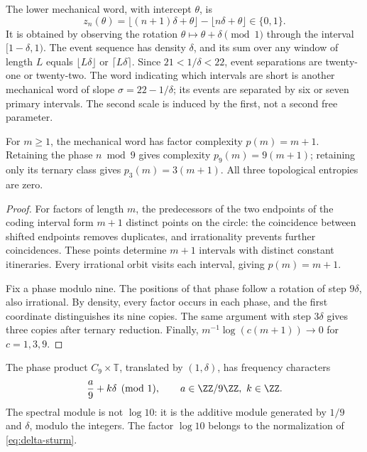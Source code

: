 The lower mechanical word, with intercept \(\theta\), is
\[
 z_n(\theta)=\lfloor(n+1)\delta+\theta\rfloor-\lfloor n\delta+\theta\rfloor\in\{0,1\}.
\]
It is obtained by observing the rotation \(\theta\mapsto\theta+\delta\pmod1\) through the interval \([1-\delta,1)\). The event sequence has density \(\delta\), and its sum over any window of length \(L\) equals \(\lfloor L\delta\rfloor\) or \(\lceil L\delta\rceil\). Since \(21<1/\delta<22\), event separations are twenty-one or twenty-two. The word indicating which intervals are short is another mechanical word of slope \(\sigma=22-1/\delta\); its events are separated by six or seven primary intervals. The second scale is induced by the first, not a second free parameter.



\begin{theorem}
For \(m\ge1\), the mechanical word has factor complexity \(p(m)=m+1\). Retaining the phase \(n\bmod9\) gives complexity \(p_9(m)=9(m+1)\); retaining only its ternary class gives \(p_3(m)=3(m+1)\). All three topological entropies are zero.
\end{theorem}
\begin{proof}
For factors of length \(m\), the predecessors of the two endpoints of the coding interval form \(m+1\) distinct points on the circle: the coincidence between shifted endpoints removes duplicates, and irrationality prevents further coincidences. These points determine \(m+1\) intervals with distinct constant itineraries. Every irrational orbit visits each interval, giving \(p(m)=m+1\).

Fix a phase modulo nine. The positions of that phase follow a rotation of step \(9\delta\), also irrational. By density, every factor occurs in each phase, and the first coordinate distinguishes its nine copies. The same argument with step \(3\delta\) gives three copies after ternary reduction. Finally, \(m^{-1}\log(c(m+1))\to0\) for \(c=1,3,9\).
\end{proof}

The phase product \(C_9\times\mathbb T\), translated by \((1,\delta)\), has frequency characters
\[
 \frac a9+k\delta\pmod1,\qquad a\in\ZZ/9\ZZ,\ k\in\ZZ.
\]
The spectral module is not \(\log10\): it is the additive module generated by \(1/9\) and \(\delta\), modulo the integers. The factor \(\log10\) belongs to the normalization of \eqref{eq:delta-sturm}.

